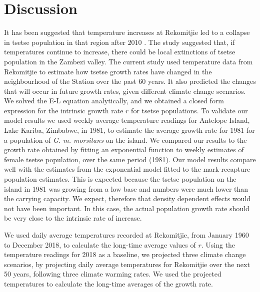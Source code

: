 \documentclass[12pt,a4paper]{article}
\begin{document}
\section*{Discussion}
It has been suggested that temperature increases at Rekomitjie led to a collapse in tsetse population in that region after 2010 \cite{Lord2018}. The study suggested that, if temperatures continue to increase, there could be local extinctions of tsetse population in the Zambezi valley.  The current study used temperature data from Rekomitjie to estimate how tsetse growth rates have changed in the neighbourhood of the Station over the past 60 years. It also predicted the changes that will occur in future growth rates, given different climate change scenarios.  We solved the E-L equation analytically, and we obtained a closed form expression for the intrinsic growth rate $r$ for tsetse populations. To validate our model results we used weekly average temperature readings for Antelope Island, Lake Kariba, Zimbabwe, in 1981, to estimate the average growth rate for 1981 for a population of \textit{G. m. morsitans} on the island. We compared our results to the growth rate obtained by fitting an exponential function to weekly estimates of female tsetse population, over the same period (1981). Our model results compare well with the estimates from the exponential model fitted to the mark-recapture population estimates. This is expected because the tsetse population on the island in 1981 was growing from a low base and numbers were much lower than the carrying capacity. We expect, therefore that density dependent effects would not have been important. In this case, the actual population growth rate should be very close to the intrinsic rate of increase.

We used daily average temperatures recorded at Rekomitjie, from January 1960 to December 2018, to calculate the long-time average values of $r$. Using the temperature readings for 2018 as a baseline, we projected three climate change scenarios, by projecting daily average temperatures for Rekomitjie over the next 50 years, following three climate warming rates. We used the projected temperatures to calculate the long-time averages of the growth rate. 
\end{document}
